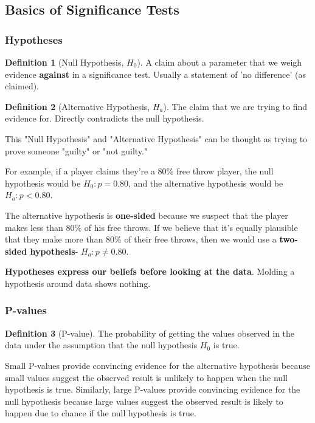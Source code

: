 \documentclass[12pt, a4paper]{article}
\theoremstyle{definition}
\newtheorem{definition}{Definition}
\begin{document}
\subsection{Basics of Significance Tests}
\subsubsection{Hypotheses}
\begin{definition}[Null Hypothesis, $H_0$]
    A claim about a parameter that we weigh evidence \textbf{against} in a significance test. Usually a statement of 'no difference' (as claimed).
\end{definition}

\begin{definition}[Alternative Hypothesis, $H_a$]
    The claim that we are trying to find evidence for. Directly contradicts the null hypothesis.
\end{definition}

This "Null Hypothesis" and "Alternative Hypothesis" can be thought as trying to prove someone "guilty" or "not guilty."

For example, if a player claims they're a 80\% free throw player, the null hypothesis would be $H_0: p = 0.80$, and the alternative hypothesis would be $H_a: p < 0.80$.

The alternative hypothesis is \textbf{one-sided} because we suspect that the player makes less than 80\% of his free throws. If we believe that it's equally plausible that they make more than 80\% of their free throws, then we would use a \textbf{two-sided hypothesis}- $H_a: p \neq 0.80$.

\textbf{Hypotheses express our beliefs before looking at the data}. Molding a hypothesis around data shows nothing.

\subsubsection{P-values}
\begin{definition}[P-value]
    The probability of getting the values observed in the data under the assumption that the null hypothesis $H_0$ is true.
\end{definition}

Small P-values provide convincing evidence for the alternative hypothesis because small values suggest the observed result is unlikely to happen when the null hypothesis is true.
Similarly, large P-values provide convincing evidence for the null hypothesis because large values suggest the observed result is likely to happen due to chance if the null hypothesis is true.
\end{document}

